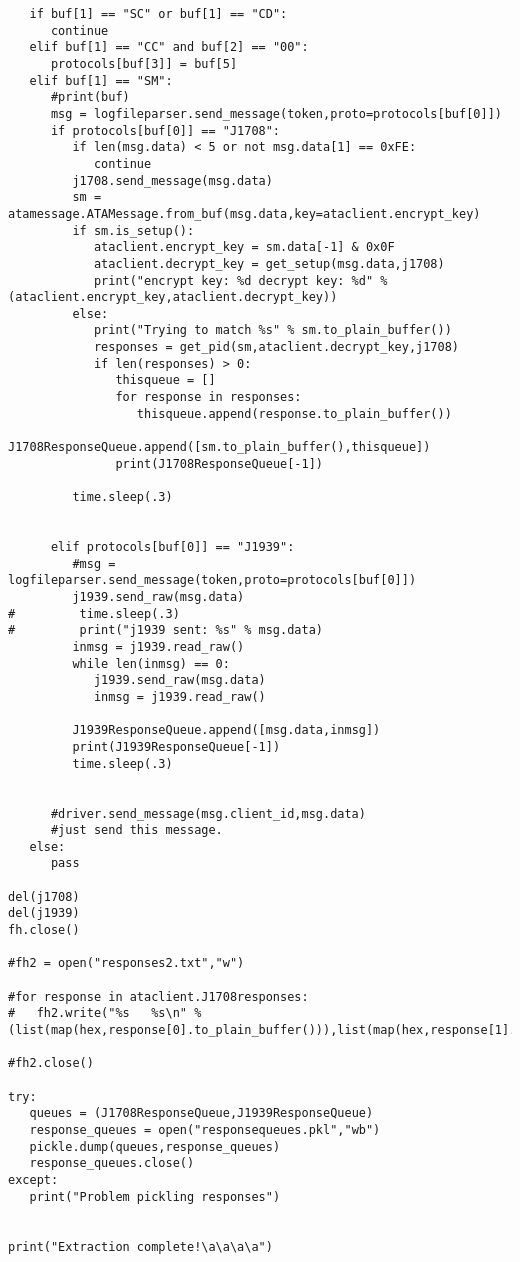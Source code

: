 \begin{verbatim}
   if buf[1] == "SC" or buf[1] == "CD":
      continue
   elif buf[1] == "CC" and buf[2] == "00":
      protocols[buf[3]] = buf[5]
   elif buf[1] == "SM":
      #print(buf)
      msg = logfileparser.send_message(token,proto=protocols[buf[0]])
      if protocols[buf[0]] == "J1708":
         if len(msg.data) < 5 or not msg.data[1] == 0xFE:
            continue
         j1708.send_message(msg.data)
         sm = atamessage.ATAMessage.from_buf(msg.data,key=ataclient.encrypt_key)
         if sm.is_setup():
            ataclient.encrypt_key = sm.data[-1] & 0x0F
            ataclient.decrypt_key = get_setup(msg.data,j1708)
            print("encrypt key: %d decrypt key: %d" % (ataclient.encrypt_key,ataclient.decrypt_key))
         else:
            print("Trying to match %s" % sm.to_plain_buffer())
            responses = get_pid(sm,ataclient.decrypt_key,j1708)
            if len(responses) > 0:
               thisqueue = []
               for response in responses:
                  thisqueue.append(response.to_plain_buffer())
               J1708ResponseQueue.append([sm.to_plain_buffer(),thisqueue])
               print(J1708ResponseQueue[-1])

         time.sleep(.3)

         
      elif protocols[buf[0]] == "J1939":
         #msg = logfileparser.send_message(token,proto=protocols[buf[0]])
         j1939.send_raw(msg.data)
#         time.sleep(.3)
#         print("j1939 sent: %s" % msg.data)
         inmsg = j1939.read_raw()
         while len(inmsg) == 0:
            j1939.send_raw(msg.data)
            inmsg = j1939.read_raw()

         J1939ResponseQueue.append([msg.data,inmsg])
         print(J1939ResponseQueue[-1])
         time.sleep(.3)

      
      #driver.send_message(msg.client_id,msg.data)
      #just send this message.
   else:
      pass

del(j1708)
del(j1939)
fh.close()

#fh2 = open("responses2.txt","w")

#for response in ataclient.J1708responses:
#   fh2.write("%s   %s\n" % (list(map(hex,response[0].to_plain_buffer())),list(map(hex,response[1].to_plain_buffer()))))

#fh2.close()

try:
   queues = (J1708ResponseQueue,J1939ResponseQueue)
   response_queues = open("responsequeues.pkl","wb")
   pickle.dump(queues,response_queues)
   response_queues.close()
except:
   print("Problem pickling responses")


print("Extraction complete!\a\a\a\a")
\end{verbatim}

